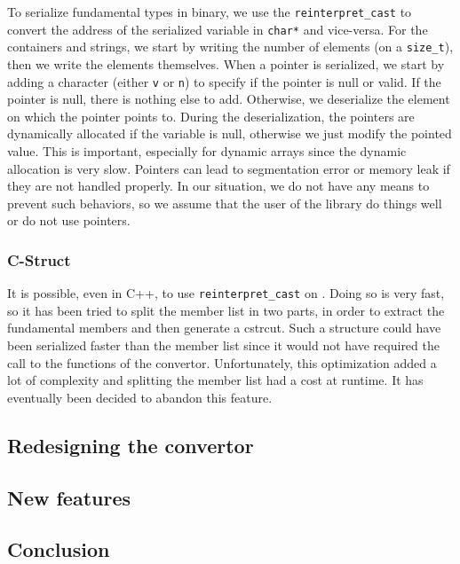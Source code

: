 To serialize fundamental types in binary, we use the \texttt{reinterpret\_cast}
to convert the address of the serialized variable in \texttt{char*} and
vice-versa. For the containers and strings, we start by writing the number of
elements (on a \texttt{size\_t}), then we write the elements themselves. When a
pointer is serialized, we start by adding a character (either \texttt{v} or
\texttt{n}) to specify if the pointer is null or valid. If the pointer is null,
there is nothing else to add. Otherwise, we deserialize the element on which the
pointer points to. During the deserialization, the pointers are dynamically
allocated if the variable is null, otherwise we just modify the pointed value.
This is important, especially for dynamic arrays since the dynamic allocation is
very slow. Pointers can lead to segmentation error or memory leak if they are
not handled properly. In our situation, we do not have any means to prevent such
behaviors, so we assume that the user of the library do things well or do not
use pointers.

\subsubsection{C-Struct}

It is possible, even in C++, to use \texttt{reinterpret\_cast} on
. Doing so is very fast, so it has been tried to split the member
list in two parts, in order to extract the fundamental members and then generate
a \gls{cstrcut}. Such a structure could have been serialized faster than the
member list since it would not have required the call to the functions of the
convertor. Unfortunately, this optimization added a lot of complexity and
splitting the member list had a cost at runtime. It has eventually been decided
to abandon this feature.

\subsection{Redesigning the convertor}
\label{sec:convertor}


\subsection{New features}

\subsection{Conclusion}
